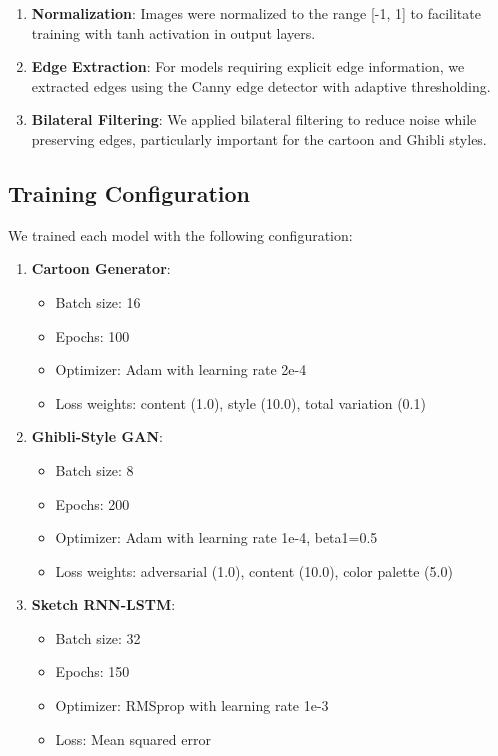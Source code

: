 \documentclass[conference]{IEEEtran}
\begin{document}
\begin{enumerate}
    \item \textbf{Normalization}: Images were normalized to the range [-1, 1] to facilitate training with tanh activation in output layers.
    
    \item \textbf{Edge Extraction}: For models requiring explicit edge information, we extracted edges using the Canny edge detector with adaptive thresholding.
    
    \item \textbf{Bilateral Filtering}: We applied bilateral filtering to reduce noise while preserving edges, particularly important for the cartoon and Ghibli styles.
\end{enumerate}

\subsection{Training Configuration}
We trained each model with the following configuration:

\begin{enumerate}
    \item \textbf{Cartoon Generator}:
    \begin{itemize}
        \item Batch size: 16
        \item Epochs: 100
        \item Optimizer: Adam with learning rate 2e-4
        \item Loss weights: content (1.0), style (10.0), total variation (0.1)
    \end{itemize}
    
    \item \textbf{Ghibli-Style GAN}:
    \begin{itemize}
        \item Batch size: 8
        \item Epochs: 200
        \item Optimizer: Adam with learning rate 1e-4, beta1=0.5
        \item Loss weights: adversarial (1.0), content (10.0), color palette (5.0)
    \end{itemize}
    
    \item \textbf{Sketch RNN-LSTM}:
    \begin{itemize}
        \item Batch size: 32
        \item Epochs: 150
        \item Optimizer: RMSprop with learning rate 1e-3
        \item Loss: Mean squared error
    \end{itemize}
\end{enumerate}
\end{document}
